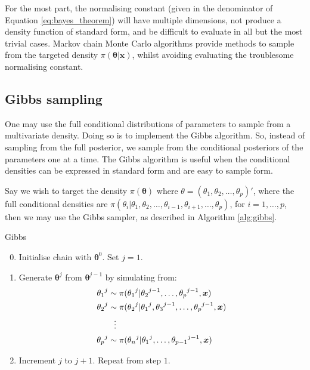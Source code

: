 For the most part, the normalising constant (given in the denominator of Equation \eqref{eq:bayes_theorem}) will have multiple dimensions, not produce a density function of standard form, and be difficult to evaluate in all but the most trivial cases. Markov chain Monte Carlo algorithms provide methods to sample from the targeted density $\pi(\bm{\theta}|\bm{x})$, whilst avoiding evaluating the troublesome normalising constant.

\subsection{Gibbs sampling}
\label{sssec:gibbs_sampling}
One may use the full conditional distributions of parameters to sample from a multivariate density. Doing so is to implement the Gibbs algorithm. So, instead of sampling from the full posterior, we sample from the conditional posteriors of the parameters one at a time. The Gibbs algorithm is useful when the conditional densities can be expressed in standard form and are easy to sample form.

Say we wish to target the density $\pi(\bm{\theta})$ where $\theta = (\theta_1, \theta_2, \dots, \theta_p)'$, where the full conditional densities are $\pi(\theta_i|\theta_1, \theta_2, \dots, \theta_{i-1}, \theta_{i+1}, \dots, \theta_p)$, for $i=1,\dots,p$, then we may use the Gibbs sampler, as described in Algorithm \ref{alg:gibbs}.

\begin{algorithm}
\caption{Gibbs}
\label{alg:gibbs}
\begin{enumerate}
    \setcounter{enumi}{-1}
    \item Initialise chain with $\bm{\theta}^{0}$. Set $j=1$.
    \item Generate $\bm{\theta}^{j}$ from $\bm{\theta}^{j-1}$ by simulating from:
    \begin{align*}
            {\theta_1}^{j} &\sim \pi({\theta_1}^{j}|{\theta_2}^{j-1},\dots,{\theta_p}^{j-1},\bm{x})\\
            {\theta_2}^{j} &\sim \pi({\theta_2}^{j}|{\theta_1}^{j}, {\theta_3}^{j-1}, \dots, {\theta_p}^{j-1},\bm{x})\\
            &\hspace{0.25cm}\vdots \\
            {\theta_p}^{j} &\sim \pi({\theta_n}^{j}|{\theta_1}^{j}, \dots, {\theta_{p-1}}^{j-1},\bm{x})
    \end{align*}
    \item Increment $j$ to $j+1$. Repeat from step $1$.
\end{enumerate}
\end{algorithm}

